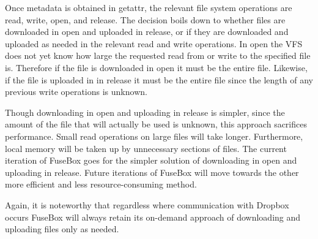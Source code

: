 \documentclass[11pt,twocolumn,letterpaper]{article}
\newcommand{\appname}{FuseBox }
\begin{document}
\par Once metadata is obtained in getattr, the relevant file system 
operations are read, write, open, and
release. The decision boils down to whether files are downloaded in open and
uploaded in release, or if they are downloaded and uploaded as needed
in the relevant read and write operations.
In open the VFS does not yet know how large the requested read from or
write to the specified file is. Therefore if the file is downloaded in
open it must be the entire file. Likewise, if the file is uploaded in
in release it must be the entire file since the length of any previous
write operations is unknown. 
\par Though downloading in open and uploading
in release is simpler, since the amount of the file that will actually
be used is unknown, this approach sacrifices performance. Small read
operations on large files will take longer. Furthermore, local memory
will be taken up by unnecessary sections of files.  
The current iteration of
\appname goes for the simpler solution of downloading in open and
uploading in release. Future iterations of \appname will move towards
the other more efficient and less resource-consuming method.  
\par Again, it is noteworthy that regardless where communication with
Dropbox occurs \appname will
always retain its on-demand approach of downloading and uploading
files only as needed. 
\end{document}
